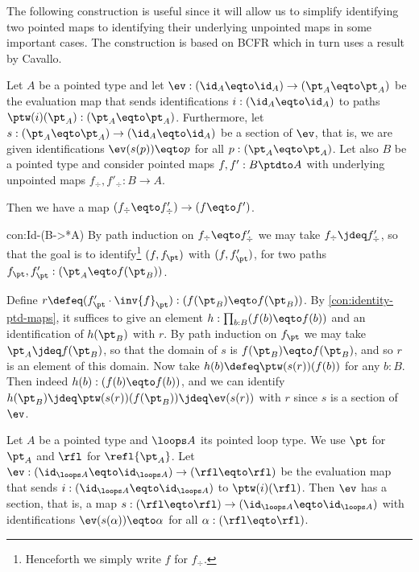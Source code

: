 The following construction is useful since it
will allow us to simplify identifying two pointed maps
to identifying their underlying unpointed maps
in some important cases. The construction is based on BCFR which
in turn uses a result by Cavallo.

\begin{construction}\label{con:Id-(B->*A)}
Let $A$ be a pointed type and let $\ev: (\id_A\eqto\id_A)\to(\pt_A\eqto\pt_A)$
be the evaluation map that sends identifications $i:(\id_A\eqto\id_A)$ 
to paths $\ptw(i)(\pt_A) : (\pt_A\eqto\pt_A)$.
Furthermore, let  $s: (\pt_A\eqto\pt_A)\to(\id_A\eqto\id_A)$
be a section of $\ev$, that is, we are given
identifications $\ev(s(p))\eqto p$ for all $p:(\pt_A\eqto\pt_A)$.
Let also $B$ be a pointed type and consider pointed
maps $f,f' : B\ptdto A$ with underlying unpointed maps
$f_\div,f'_\div : B\to A$.

Then we have a map $(f_\div\eqto f'_\div)\to(f\eqto f')$.
\end{construction}

\begin{implementation}{con:Id-(B->*A)}
By path induction on $f_\div\eqto f'_\div$ we may take
$f_\div\jdeq f'_\div$, so that the goal is to identify\footnote{%
Henceforth we simply write $f$ for $f_\div$.}
$(f,f_\pt)$ with $(f,f'_\pt)$, 
for two paths $f_\pt,f'_\pt: (\pt_A\eqto f(\pt_B))$.

Define $r\defeq (f'_\pt\cdot\inv{f}_\pt) : (f(\pt_B)\eqto f(\pt_B))$.
By \cref{con:identity-ptd-maps}, it suffices to give
an element $h: \prod_{b:B}(f(b)\eqto f(b))$ and an identification
of $h(\pt_B)$ with $r$.
By path induction on $f_\pt$ we may take $\pt_A\jdeq f(\pt_B)$,
so that the domain of $s$ is $f(\pt_B)\eqto f(\pt_B)$,
and so $r$ is an element of this domain. 
Now take $h(b)\defeq \ptw(s(r))(f(b))$ for any $b:B$.
Then indeed $h(b):(f(b)\eqto f(b))$, and we can identify
$h(\pt_B)\jdeq \ptw(s(r))(f(\pt_B))\jdeq\ev(s(r))$ with $r$ 
since $s$ is a section of $\ev$.
\end{implementation}

\begin{construction}\label{con:ev-section-loopsA}
Let $A$ be a pointed type and $\loops A$ its pointed loop type.
We use $\pt$ for $\pt_A$ and $\rfl$ for $\refl{\pt_A}$.
Let $\ev: (\id_{\loops A}\eqto\id_{\loops A})\to (\rfl\eqto\rfl)$ 
be the evaluation map that sends $i:(\id_{\loops A}\eqto\id_{\loops A})$
to $\ptw(i)(\rfl)$. 
Then $\ev$ has a section, that is, a 
map $s: (\rfl\eqto\rfl)\to(\id_{\loops A}\eqto\id_{\loops A})$
with identifications $\ev(s(\alpha))\eqto\alpha$ for 
all $\alpha: (\rfl\eqto\rfl)$.
\end{construction}

